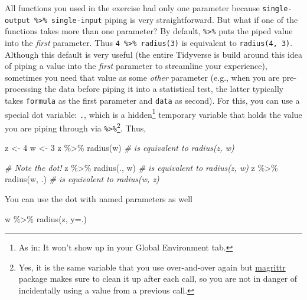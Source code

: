\documentclass[
]{book}
\newenvironment{Shaded}{\begin{snugshade}}{\end{snugshade}}
\newcommand{\AttributeTok}[1]{\textcolor[rgb]{0.77,0.63,0.00}{#1}}
\newcommand{\CommentTok}[1]{\textcolor[rgb]{0.56,0.35,0.01}{\textit{#1}}}
\newcommand{\DecValTok}[1]{\textcolor[rgb]{0.00,0.00,0.81}{#1}}
\newcommand{\FunctionTok}[1]{\textcolor[rgb]{0.00,0.00,0.00}{#1}}
\newcommand{\NormalTok}[1]{#1}
\newcommand{\OtherTok}[1]{\textcolor[rgb]{0.56,0.35,0.01}{#1}}
\newcommand{\SpecialCharTok}[1]{\textcolor[rgb]{0.00,0.00,0.00}{#1}}
\begin{document}
All functions you used in the exercise had only one parameter because \texttt{single-output\ \%\textgreater{}\%\ single-input} piping is very straightforward. But what if one of the functions takes more than one parameter? By default, \texttt{\%\textgreater{}\%} puts the piped value into the \emph{first} parameter. Thus \texttt{4\ \%\textgreater{}\%\ radius(3)} is equivalent to \texttt{radius(4,\ 3)}. Although this default is very useful (the entire Tidyverse is build around this idea of piping a value into the \emph{first} parameter to streamline your experience), sometimes you need that value as some \emph{other} parameter (e.g., when you are pre-processing the data before piping it into a statistical test, the latter typically takes \texttt{formula} as the first parameter and \texttt{data} as second). For this, you can use a special dot variable: \texttt{.}, which is a hidden\footnote{As in: It won't show up in your Global Environment tab.} temporary variable that holds the value you are piping through via \texttt{\%\textgreater{}\%}\footnote{Yes, it is the same variable that you use over-and-over again but \href{https://magrittr.tidyverse.org/articles/magrittr.html}{magrittr} package makes sure to clean it up after each call, so you are not in danger of incidentally using a value from a previous call.}. Thus,

\begin{Shaded}
\begin{Highlighting}[]
\NormalTok{z }\OtherTok{\textless{}{-}} \DecValTok{4}
\NormalTok{w }\OtherTok{\textless{}{-}} \DecValTok{3}
\NormalTok{z }\SpecialCharTok{\%\textgreater{}\%} \FunctionTok{radius}\NormalTok{(w) }\CommentTok{\# is equivalent to radius(z, w)}

\CommentTok{\# Note the dot!}
\NormalTok{z }\SpecialCharTok{\%\textgreater{}\%} \FunctionTok{radius}\NormalTok{(., w) }\CommentTok{\# is equivalent to radius(z, w)}
\NormalTok{z }\SpecialCharTok{\%\textgreater{}\%} \FunctionTok{radius}\NormalTok{(w, .) }\CommentTok{\# is equivalent to radius(w, z)}
\end{Highlighting}
\end{Shaded}

You can use the dot with named parameters as well

\begin{Shaded}
\begin{Highlighting}[]
\NormalTok{w }\SpecialCharTok{\%\textgreater{}\%} \FunctionTok{radius}\NormalTok{(z, }\AttributeTok{y=}\NormalTok{.)}
\end{Highlighting}
\end{Shaded}
\end{document}
